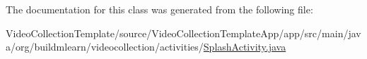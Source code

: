 The documentation for this class was generated from the following file\+:\begin{DoxyCompactItemize}
\item 
Video\+Collection\+Template/source/\+Video\+Collection\+Template\+App/app/src/main/java/org/buildmlearn/videocollection/activities/\hyperlink{VideoCollectionTemplate_2source_2VideoCollectionTemplateApp_2app_2src_2main_2java_2org_2buildmle84db7cf67c6803c4f0512a31fa3b2aa3}{Splash\+Activity.\+java}\end{DoxyCompactItemize}

